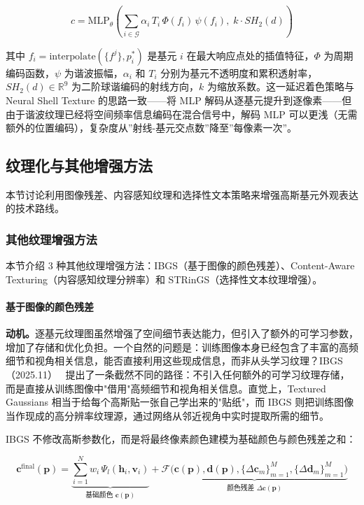 \begin{equation}
    c = \mathrm{MLP}_\theta \!\left( \sum_{i \in \mathcal{G}} \alpha_i\, T_i\, \Phi(f_i)\, \psi(f_i),\; k \cdot SH_2(d) \right)
\end{equation}

其中 $f_i = \mathrm{interpolate}(\{f^j\}, p_i^*)$ 是基元 $i$ 在最大响应点处的插值特征，$\Phi$ 为周期编码函数，$\psi$ 为谐波振幅，$\alpha_i$ 和 $T_i$ 分别为基元不透明度和累积透射率，$SH_2(d) \in \mathbb{R}^9$ 为二阶球谐编码的射线方向，$k$ 为缩放系数。这一延迟着色策略与 Neural Shell Texture 的思路一致——将 MLP 解码从逐基元提升到逐像素——但由于谐波纹理已经将空间频率信息编码在混合信号中，解码 MLP 可以更浅（无需额外的位置编码），复杂度从”射线-基元交点数”降至”每像素一次”。

\subsection{纹理化与其他增强方法}
\label{ss:03_3a}

本节讨论利用图像残差、内容感知纹理和选择性文本策略来增强高斯基元外观表达的技术路线。

\subsubsection{其他纹理增强方法}

本节介绍 3 种其他纹理增强方法：IBGS（基于图像的颜色残差）、Content-Aware Texturing（内容感知纹理分辨率）和 STRinGS（选择性文本纹理增强）。

\paragraph{基于图像的颜色残差}

\textbf{动机。}逐基元纹理图虽然增强了空间细节表达能力，但引入了额外的可学习参数，增加了存储和优化负担。一个自然的问题是：训练图像本身已经包含了丰富的高频细节和视角相关信息，能否直接利用这些现成信息，而非从头学习纹理？IBGS（2025.11）~\cite{2511_14357} 提出了一条截然不同的路径：不引入任何额外的可学习纹理存储，而是直接从训练图像中"借用"高频细节和视角相关信息。直觉上，Textured Gaussians 相当于给每个高斯贴一张自己学出来的"贴纸"，而 IBGS 则把训练图像当作现成的高分辨率纹理源，通过网络从邻近视角中实时提取所需的细节。

IBGS 不修改高斯参数化，而是将最终像素颜色建模为基础颜色与颜色残差之和：

\begin{equation}
    \mathbf{c}^{\mathrm{final}}(\mathbf{p}) = \underbrace{\sum_{i=1}^{N} w_i \, \Psi_l(\mathbf{h}_i, \mathbf{v}_i)}_{\text{基础颜色 } \mathbf{c}(\mathbf{p})} + \underbrace{\mathcal{F}\!\bigl(\mathbf{c}(\mathbf{p}), \mathbf{d}(\mathbf{p}), \{\Delta\mathbf{c}_m\}_{m=1}^{M}, \{\Delta\mathbf{d}_m\}_{m=1}^{M}\bigr)}_{\text{颜色残差 } \Delta\mathbf{c}(\mathbf{p})}
\end{equation}

